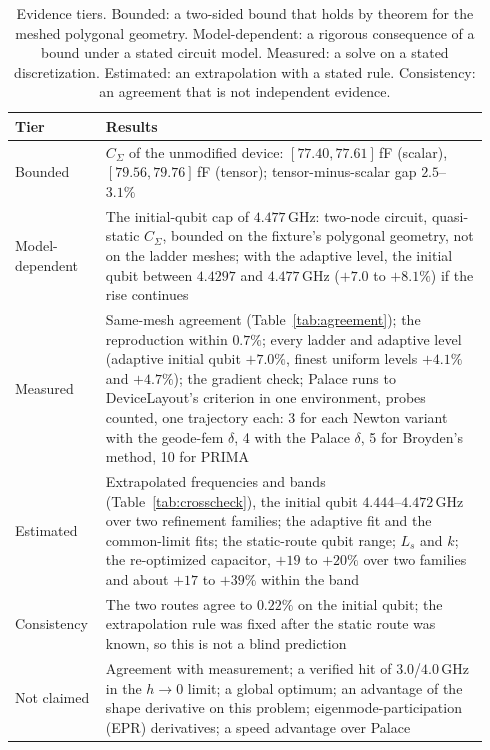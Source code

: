 \documentclass{anvil-paper}
\begin{document}
\begin{table}[htbp]
  \centering
  \caption{Evidence tiers. Bounded: a two-sided bound that holds by theorem
  for the meshed polygonal geometry. Model-dependent: a rigorous consequence of a
  bound under a stated circuit model. Measured: a solve on a stated
  discretization. Estimated: an extrapolation with a stated rule.
  Consistency: an agreement that is not independent evidence.}
  \label{tab:tiers}
  \footnotesize
  \begin{tabular}{@{}>{\raggedright\arraybackslash}p{0.17\linewidth}>{\raggedright\arraybackslash}p{0.77\linewidth}@{}}
    \toprule
    Tier & Results \\
    \midrule
    Bounded & $C_\Sigma$ of the unmodified device: $[77.40, 77.61]$\,fF (scalar), $[79.56, 79.76]$\,fF (tensor); tensor-minus-scalar gap $2.5$--$3.1\%$ \\
    Model-dependent & The initial-qubit cap of $4.477$\,GHz: two-node circuit, quasi-static $C_\Sigma$, bounded on the fixture's polygonal geometry, not on the ladder meshes; with the adaptive level, the initial qubit between $4.4297$ and $4.477$\,GHz ($+7.0$ to $+8.1\%$) if the rise continues \\
    Measured & Same-mesh agreement (Table~\ref{tab:agreement}); the reproduction within $0.7\%$; every ladder and adaptive level (adaptive initial qubit $+7.0\%$, finest uniform levels $+4.1\%$ and $+4.7\%$); the gradient check; Palace runs to DeviceLayout's criterion in one environment, probes counted, one trajectory each: 3 for each Newton variant with the geode-fem $\delta$, 4 with the Palace $\delta$, 5 for Broyden's method, 10 for PRIMA \\
    Estimated & Extrapolated frequencies and bands (Table~\ref{tab:crosscheck}), the initial qubit $4.444$--$4.472$\,GHz over two refinement families; the adaptive fit and the common-limit fits; the static-route qubit range; $L_s$ and $k$; the re-optimized capacitor, $+19$ to $+20\%$ over two families and about $+17$ to $+39\%$ within the band \\
    Consistency & The two routes agree to $0.22\%$ on the initial qubit; the extrapolation rule was fixed after the static route was known, so this is not a blind prediction \\
    Not claimed & Agreement with measurement; a verified hit of $3.0$/$4.0$\,GHz in the $h \to 0$ limit; a global optimum; an advantage of the shape derivative on this problem; eigenmode-participation (EPR) derivatives; a speed advantage over Palace \\
    \bottomrule
  \end{tabular}
\end{table}
\end{document}
